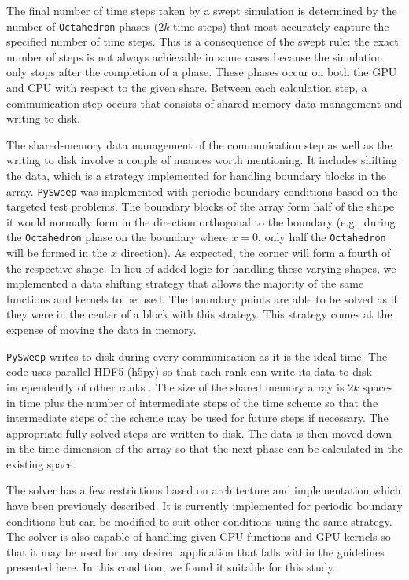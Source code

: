 \documentclass[preprints,article,accept,moreauthors,pdftex]{Definitions/mdpi}
\def\pysweep{\texttt{PySweep}}
\def\Oct{\texttt{Octahedron}}
\begin{document}
The final number of time steps taken by a swept simulation is determined by the number of \Oct{} phases ($2k$ time steps) that most accurately capture the specified number of time steps. This is a consequence of the swept rule: the exact number of steps is not always achievable in some cases because the simulation only stops after the completion of a phase. These phases occur on both the GPU and CPU with respect to the given share. Between each calculation step, a communication step occurs that consists of shared memory data management and writing to disk.

The shared-memory data management of the communication step as well as the writing to disk involve a couple of nuances worth mentioning. It includes shifting the data, which is a strategy implemented for handling boundary blocks in the array. \pysweep{} was implemented with periodic boundary conditions based on the targeted test problems. The boundary blocks of the array form half of the shape it would normally form in the direction orthogonal to the boundary (e.g., during the \Oct{} phase on the boundary where $x=0$, only half the \Oct{} will be formed in the $x$ direction). As expected, the corner will form a fourth of the respective shape. In lieu of added logic for handling these varying shapes, we implemented a data shifting strategy that allows the majority of the same functions and kernels to be used. The boundary points are able to be solved as if they were in the center of a block with this strategy. This strategy comes at the expense of moving the data in memory. 

\pysweep{} writes to disk during every communication as it is the ideal time. The code uses parallel HDF5 (h5py) so that each rank can write its data to disk independently of other ranks \cite{Collette2008HDF5Python}. The size of the shared memory array is $2k$ spaces in time plus the number of intermediate steps of the time scheme so that the intermediate steps of the scheme may be used for future steps if necessary. The appropriate fully solved steps are written to disk. The data is then moved down in the time dimension of the array so that the next phase can be calculated in the existing space.

The solver has a few restrictions based on architecture and implementation which have been previously described. It is currently implemented for periodic boundary conditions but can be modified to suit other conditions using the same strategy. The solver is also capable of handling given CPU functions and GPU kernels so that it may be used for any desired application that falls within the guidelines presented here. In this condition, we found it suitable for this study.
\end{document}
